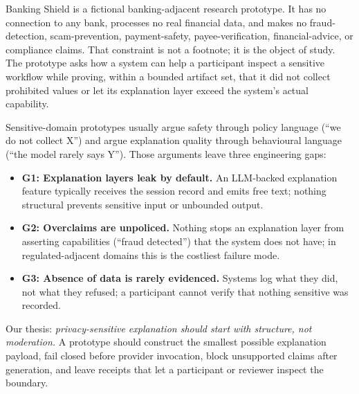 \documentclass[conference]{IEEEtran}
\newcommand{\sys}{Banking Shield}
\begin{document}
\sys{} is a fictional banking-adjacent research prototype. It has no connection
to any bank, processes no real financial data, and makes no fraud-detection,
scam-prevention, payment-safety, payee-verification, financial-advice, or
compliance claims. That constraint is not a footnote; it is the object of study.
The prototype asks how a system can help a participant inspect a sensitive
workflow while proving, within a bounded artifact set, that it did not collect
prohibited values or let its explanation layer exceed the system's actual
capability.

Sensitive-domain prototypes usually argue safety through policy language
(``we do not collect X'') and argue explanation quality through behavioural
language (``the model rarely says Y''). Those arguments leave three engineering
gaps:

\begin{itemize}
  \item \textbf{G1: Explanation layers leak by default.} An LLM-backed
    explanation feature typically receives the session record and emits free
    text; nothing structural prevents sensitive input or unbounded output.
  \item \textbf{G2: Overclaims are unpoliced.} Nothing stops an explanation
    layer from asserting capabilities (``fraud detected'') that the system does
    not have; in regulated-adjacent domains this is the costliest failure mode.
  \item \textbf{G3: Absence of data is rarely evidenced.} Systems log what they
    did, not what they refused; a participant cannot verify that nothing
    sensitive was recorded.
\end{itemize}

Our thesis: \emph{privacy-sensitive explanation should start with structure,
not moderation.} A prototype should construct the smallest possible explanation
payload, fail closed before provider invocation, block unsupported claims after
generation, and leave receipts that let a participant or reviewer inspect the
boundary.
\end{document}
